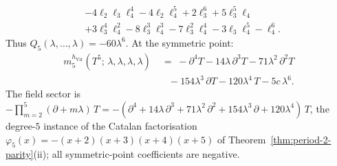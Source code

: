\begin{proposition}
\[\begin{aligned}
&- 4\ell_2\ell_3\ell_4^4 - 4\ell_2\ell_4^5
+ 2\ell_3^6 + 5\ell_3^5\ell_4
\\
&+ 3\ell_3^4\ell_4^2 - 8\ell_3^3\ell_4^3
- 7\ell_3^2\ell_4^4
- 3\ell_3\ell_4^5 - \ell_4^6 .
\end{aligned}
\]
Thus \(Q_5(\lambda,\ldots,\lambda)=-60\lambda^6\).
At the symmetric point:
\begin{equation}\label{eq:gravity-m5-sym}
\begin{aligned}
m_5^{h_{\mathrm{Vir}}}(T^5;\,\lambda,\lambda,\lambda,\lambda)
&\;=\;
-\partial^4 T
- 14\lambda\,\partial^3 T
- 71\lambda^2\,\partial^2 T
\\
&\quad
- 154\lambda^3\,\partial T
- 120\lambda^4\, T
- 5c\,\lambda^6.
\end{aligned}
\end{equation}
The field sector is $-\prod_{m=2}^{5}(\partial + m\lambda)\,T
= -(\partial^4 + 14\lambda\,\partial^3 + 71\lambda^2\,\partial^2
+ 154\lambda^3\,\partial + 120\lambda^4)\,T$, the degree-$5$ instance
of the Catalan factorisation
$\varphi_5(x) = -(x+2)(x+3)(x+4)(x+5)$
of Theorem~\ref{thm:period-2-parity}(ii); all symmetric-point
coefficients are negative.
\end{proposition}

